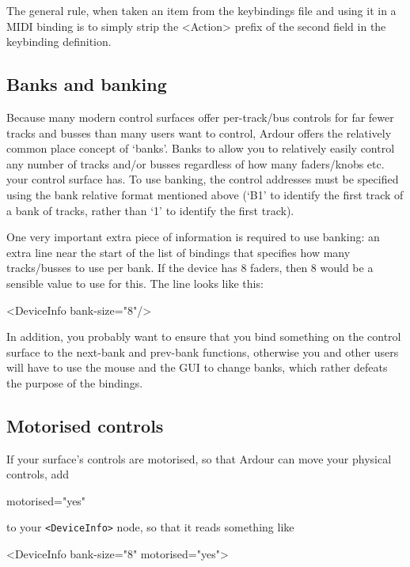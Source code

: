 \documentclass[10pt,a4paper]{book}
\begin{document}
{The general rule, when taken an item from the keybindings file and
using it in a MIDI binding is to simply strip the <Action> prefix of
the second field in the keybinding definition.

\subsection{Banks and banking}

Because many modern control surfaces offer per-track/bus controls for
far fewer tracks and busses than many users want to control, Ardour
offers the relatively common place concept of `banks'. Banks to allow
you to relatively easily control any number of tracks and/or busses
regardless of how many faders/knobs etc. your control surface has. To
use banking, the control addresses must be specified using the bank
relative format mentioned above (`B1' to identify the first track of a
bank of tracks, rather than `1' to identify the first track).

One very important extra piece of information is required to use
banking: an extra line near the start of the list of bindings that
specifies how many tracks/busses to use per bank. If the device has 8
faders, then 8 would be a sensible value to use for this. The line
looks like this:

\begin{listing}
<DeviceInfo bank-size="8"/>
\end{listing}

In addition, you probably want to ensure that you bind something on
the control surface to the next-bank and prev-bank functions,
otherwise you and other users will have to use the mouse and the GUI
to change banks, which rather defeats the purpose of the bindings.

\subsection{Motorised controls}

If your surface's controls are motorised, so that Ardour can move your physical controls,
add

\begin{listing}
motorised="yes"
\end{listing}

to your \texttt{<DeviceInfo>} node, so that it reads something like

\begin{listing}
<DeviceInfo bank-size="8" motorised="yes">
\end{listing}

}
\end{document}
